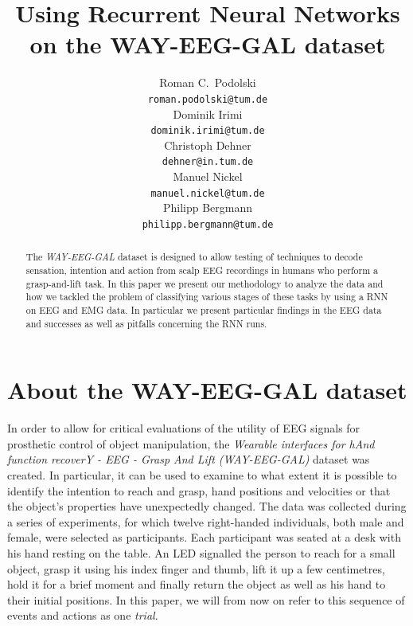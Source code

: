 \documentclass{article} %
\title{Using Recurrent Neural Networks on the WAY-EEG-GAL dataset}
\author{
Roman C.~Podolski
\\
\texttt{roman.podolski@tum.de} \\
\And
Dominik Irimi \\
\texttt{dominik.irimi@tum.de} \\
\AND
Christoph Dehner \\
\texttt{dehner@in.tum.de} \\
\And
Manuel Nickel \\
\texttt{manuel.nickel@tum.de} \\
\And
Philipp Bergmann \\
\texttt{philipp.bergmann@tum.de} \\
}
\begin{document}
\maketitle

\begin{abstract}
The \emph{WAY-EEG-GAL} dataset is designed to allow testing of techniques to decode sensation, intention and action from scalp EEG recordings in humans who perform a grasp-and-lift task. In this paper we present our methodology to analyze the data and how we tackled the problem of classifying various stages of these tasks by using a RNN on EEG and EMG data. In particular we present particular findings in the EEG data and successes as well as pitfalls concerning the RNN runs.
\end{abstract}

\section{About the WAY-EEG-GAL dataset}\label{sec:tsne}
In order to allow for critical evaluations of the utility of EEG signals for prosthetic control of object manipulation, the \emph{Wearable interfaces for hAnd function recoverY - EEG - Grasp And Lift (WAY-EEG-GAL)} dataset was created. In particular, it can be used to examine to what extent it is possible to identify the intention to reach and grasp, hand positions and velocities or that the object's properties have unexpectedly changed. The data was collected during a series of experiments, for which twelve right-handed individuals, both male and female, were selected as participants. Each participant was seated at a desk with his hand resting on the table. An LED signalled the person to reach for a small object, grasp it using his index finger and thumb, lift it up a few centimetres, hold it for a brief moment and finally return the object as well as his hand to their initial positions. In this paper, we will from now on refer to this sequence of events and actions as one \emph{trial}.
\end{document}
